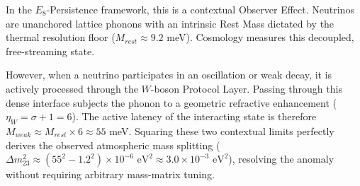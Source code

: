 In the $E_8$-Persistence framework, this is a contextual Observer Effect. Neutrinos are unanchored lattice phonons with an intrinsic Rest Mass dictated by the thermal resolution floor ($M_{rest} \approx 9.2$ meV). Cosmology measures this decoupled, free-streaming state. 

However, when a neutrino participates in an oscillation or weak decay, it is actively processed through the $W$-boson Protocol Layer. Passing through this dense interface subjects the phonon to a geometric refractive enhancement ($\eta_W = \sigma + 1 = 6$). The active latency of the interacting state is therefore $M_{weak} \approx M_{rest} \times 6 \approx 55$ meV. Squaring these two contextual limits perfectly derives the observed atmospheric mass splitting ($\Delta m^2_{23} \approx (55^2 - 1.2^2) \times 10^{-6} \text{ eV}^2 \approx 3.0 \times 10^{-3} \text{ eV}^2$), resolving the anomaly without requiring arbitrary mass-matrix tuning.